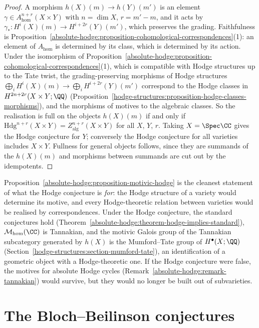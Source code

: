 \begin{proof}
A morphism $h(X)(m) \to h(Y)(m')$ is an element $\gamma \in A^{n+r}_{\mathrm{hom}}(X \times Y)$ with $n = \dim X$, $r = m' - m$, and it acts by $\gamma_* \colon H^i(X)(m) \to H^{i+2r}(Y)(m')$, which preserves the grading.
Faithfulness is Proposition~\ref{absolute-hodge:proposition-cohomological-correspondences}(1): an element of $A_{\mathrm{hom}}$ is determined by its class, which is determined by its action. Under the
isomorphism of Proposition~\ref{absolute-hodge:proposition-cohomological-correspondences}(1), which is compatible with Hodge structures up to the Tate twist, the grading-preserving morphisms of Hodge
structures $\bigoplus_iH^i(X)(m) \to \bigoplus_iH^{i+2r}(Y)(m')$ correspond to the Hodge classes in $H^{2n+2r}(X \times Y; \QQ)$ (Proposition~\ref{hodge-structures:proposition-hodge-classes-morphisms}), and the
morphisms of motives to the algebraic classes. So the realisation is full on the objects $h(X)(m)$ if and only if $\mathrm{Hdg}^{n+r}(X \times Y) = Z^{n+r}_{\mathrm{alg}}(X \times Y)$ for all $X$, $Y$, $r$. Taking $X = \Spec\CC$
gives the Hodge conjecture for $Y$; conversely the Hodge conjecture for all varieties includes $X \times Y$. Fullness for general objects follows, since they are summands of the $h(X)(m)$ and morphisms between
summands are cut out by the idempotents.
\end{proof}

\begin{remark}\label{absolute-hodge:remark-motivic-galois}
Proposition~\ref{absolute-hodge:proposition-motivic-hodge} is the cleanest statement of what the Hodge conjecture is \emph{for}: the Hodge structure of a variety would determine its motive, and every
Hodge-theoretic relation between varieties would be realised by correspondences. Under the Hodge conjecture, the standard conjectures hold (Theorem~\ref{absolute-hodge:theorem-hodge-implies-standard}),
$\mathcal{M}_{\mathrm{hom}}(\CC)$ is Tannakian, and the motivic Galois group of the Tannakian subcategory generated by $h(X)$ is the Mumford--Tate group of $H^\bullet(X; \QQ)$
(Section~\ref{hodge-structures:section-mumford-tate}), an identification of a geometric object with a Hodge-theoretic one. If the Hodge conjecture were false, the motives for absolute Hodge cycles
(Remark~\ref{absolute-hodge:remark-tannakian}) would survive, but they would no longer be built out of subvarieties.
\end{remark}

\section{The Bloch--Beilinson conjectures}\label{absolute-hodge:section-bloch-beilinson}

